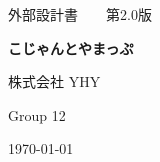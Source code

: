 \begin{titlepage}
    \centering
    {\large 外部設計書　　第2.0版\par}
    \vspace{2cm}

    {\LARGE \textbf{こじゃんとやまっぷ}\par}
    \vspace{2cm}

    {\large 株式会社 YHY\par Group 12\par}
    \vspace{2cm}
    {\large \today \par}
\end{titlepage}